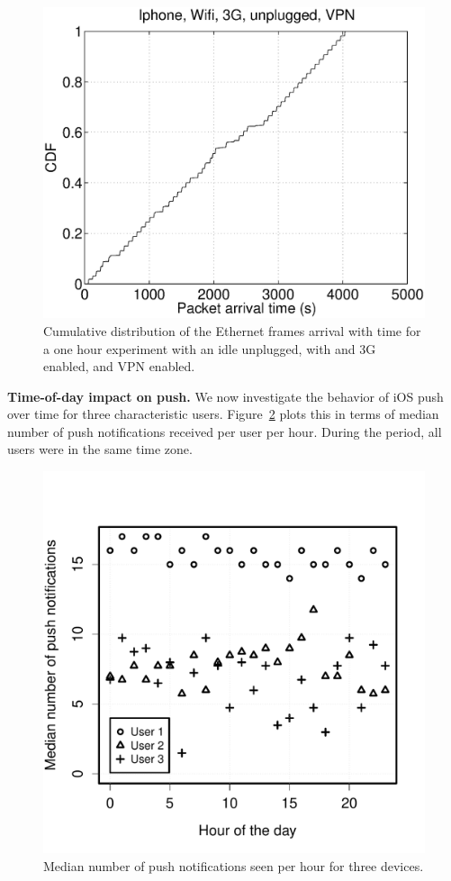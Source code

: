 \begin{figure}
\centering
        \includegraphics[width=0.8\linewidth]{../../code/pushNotification/Fig/bw_iphone_wifi_3g_unplug_vpn_ts.eps}
  \caption{Cumulative distribution of the Ethernet frames
          arrival with time for a one hour experiment with an idle
          \iphone{} unplugged, with \wifi{} and 3G enabled, and VPN
          enabled.}
  \label{fig:push_w3v_ts}
\end{figure}

\noindent\textbf{Time-of-day impact on push.} We now investigate 
the behavior of iOS push over time for three characteristic users. Figure~\ref{fig:pushHourly} 
plots this in terms of median number of push notifications received per 
user per hour. During the period, all users were in the same time zone.

\begin{figure}
\centering
        \includegraphics[width=\linewidth]{./plots/iosPushHourDistrib.pdf}
  \caption{Median number of push notifications seen per hour for three devices.}
  \label{fig:pushHourly}
\end{figure}

